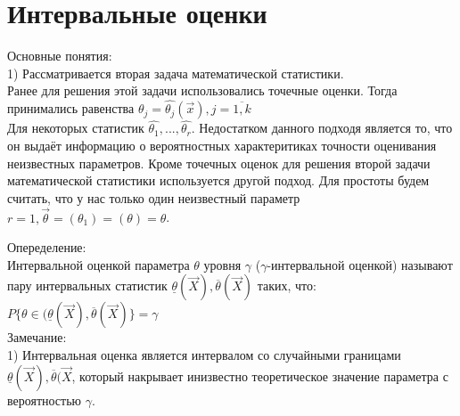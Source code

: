 \section{Интервальные оценки}
Основные понятия:\\
1) Рассматривается вторая задача математической статистики.\\

Ранее для решения этой задачи использовались точечные оценки. Тогда принимались равенства $\theta_{j} = \hat{\theta_{j}}(\overrightarrow{x}), j = \overline{1, k}$\\
Для некоторых статистик $\hat{\theta_{1}}, ..., \hat{\theta_{r}}$. Недостатком данного подходя является то, что он выдаёт информацию о вероятностных характеритиках точности оценивания неизвестных параметров. Кроме точечных оценок для решения второй задачи математической статистики используется другой подход. Для простоты будем считать, что у нас только один неизвестный параметр $r = 1, \overrightarrow{\theta} = (\theta_{1}) = (\theta) = \theta$.

Опеределение:\\
Интервальной оценкой параметра $\theta$ уровня $\gamma$ ($\gamma$-интервальной оценкой) называют пару интервальных статистик $\underline{\theta}(\overrightarrow{X}), \overline{\theta}(\overrightarrow{X})$ таких, что:\\
$P\{\theta \in (\underline{\theta}(\overrightarrow{X}), \overline{\theta}(\overrightarrow{X})\} = \gamma$\\

Замечание:\\
1) Интервальная оценка является интервалом со случайными границами $\underline{\theta}(\overrightarrow{X}), \overline{\theta}(\overrightarrow{X}$, который  накрывает инизвестно теоретическое значение параметра с вероятностью $\gamma$.

































